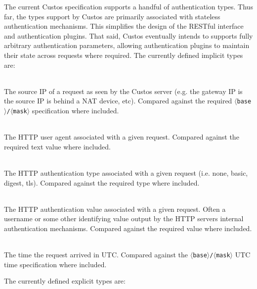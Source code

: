 The current Custos specification supports a handful of authentication
types. Thus far, the types support by Custos are primarily associated
with stateless authentication mechanisms. This simplifies the design of
the RESTful interface and authentication plugins. That said, Custos
eventually intends to supports fully arbitrary authentication parameters,
allowing authentication plugins to maintain their state across
requests where required. The currently defined implicit types are:

\begin{packed_desc}
\item[\texttt{ip\_src}] \hfill \\ The source IP of a request as seen
  by the Custos server (e.g. the gateway IP is the source IP is behind
  a NAT device, etc). Compared against the required
  \texttt{$\langle$base$\rangle$/$\langle$mask$\rangle$} specification where
  included.
\item[\texttt{user\_agent}] \hfill \\ The HTTP user agent
  associated with a given request. Compared against the required text
  value where included.
\item[\texttt{auth\_type}] \hfill \\ The HTTP authentication type
  associated with a given request (i.e. none, basic, digest,
  tls). Compared against the required type where included.
\item[\texttt{auth\_value}] \hfill \\ The HTTP authentication value
  associated with a given request. Often a username or some other
  identifying value output by the HTTP servers internal authentication
  mechanisms. Compared against the required value where included.
\item[\texttt{time\_utc}] \hfill \\ The time the request arrived in
  UTC. Compared against the
  \texttt{$\langle$base$\rangle$/$\langle$mask$\rangle$} UTC time
  specification where included.
\end{packed_desc}

\noindent
The currently defined explicit types are:

